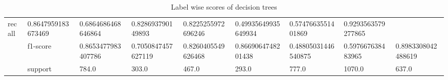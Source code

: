 \begin{table}[]
{\begin{tabular}{@{}cllllllll@{}}
  \multicolumn{1}{l|}{recall} &
  \multicolumn{1}{l|}{0.8647959183673469} &
  \multicolumn{1}{l|}{0.6864686468646864} &
  \multicolumn{1}{l|}{0.828693790149893} &
  \multicolumn{1}{l|}{0.8225255972696246} &
  \multicolumn{1}{l|}{0.49935649935649934} &
  \multicolumn{1}{l|}{0.5747663551401869} &
  \multicolumn{1}{l|}{0.9293563579277865} \\ \cmidrule(l){2-9} 
\multicolumn{1}{|c|}{} &
  \multicolumn{1}{l|}{f1-score} &
  \multicolumn{1}{l|}{0.8653477983407786} &
  \multicolumn{1}{l|}{0.7050847457627119} &
  \multicolumn{1}{l|}{0.8260405549626468} &
  \multicolumn{1}{l|}{0.8669064748201438} &
  \multicolumn{1}{l|}{0.48805031446540875} &
  \multicolumn{1}{l|}{0.597667638483965} &
  \multicolumn{1}{l|}{0.8983308042488619} \\ \cmidrule(l){2-9} 
\multicolumn{1}{|c|}{} &
  \multicolumn{1}{l|}{support} &
  \multicolumn{1}{l|}{784.0} &
  \multicolumn{1}{l|}{303.0} &
  \multicolumn{1}{l|}{467.0} &
  \multicolumn{1}{l|}{293.0} &
  \multicolumn{1}{l|}{777.0} &
  \multicolumn{1}{l|}{1070.0} &
  \multicolumn{1}{l|}{637.0} \\ \bottomrule
\end{tabular}%
}
\caption{Label wise scores of decision trees}
\label{tab:Label_wise_decision_tree}
\end{table}

